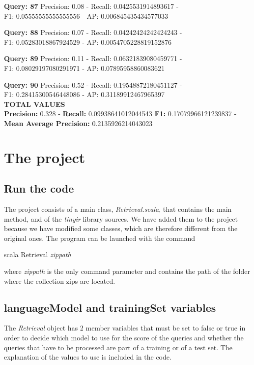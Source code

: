 \documentclass[a4paper, 11pt]{article}
\begin{document}
\textbf{Query: 87}
Precision: 0.08 - Recall: 0.0425531914893617 - \\
F1: 0.05555555555555556 - AP:  0.006845435434577033

\textbf{Query: 88}
Precision: 0.07 - Recall: 0.04242424242424243 - \\
F1: 0.05283018867924529 - AP:  0.0054705228819152876

\textbf{Query: 89}
Precision: 0.11 - Recall: 0.06321839080459771 - \\
F1: 0.08029197080291971 - AP:  0.07895958860083621

\textbf{Query: 90}
Precision: 0.52 - Recall: 0.19548872180451127 - \\
F1: 0.28415300546448086 - AP:  0.31189912467965397\\

\textbf{TOTAL VALUES}\\

\textbf{Precision:} 0.328 - \textbf{Recall:} 0.09938641012044543 \textbf{F1:} 0.17079966121239837 -\\
 \textbf{Mean Average Precision:} 0.2135926214043023


\section{The project}

\subsection{Run the code}
The project consists of a main class, \textit{Retrieval.scala}, that contains the main method, and of the \textit{tinyir} library sources. We have added them to the project because we have modified some classes, which are therefore different from the original ones.
The program can be launched with the command

\begin{center}
scala Retrieval \textit{zippath}
\end{center}

where \textit{zippath} is the only command parameter and contains the path of the folder where the collection zips are located.

\subsection{languageModel and trainingSet variables}
The \textit{Retrieval} object has 2 member variables that must be set to false or true in order to decide which model to use for the score of the queries and whether the queries 
that have to be processed are part of a training or of a test set. The explanation of the values to use is included in the code.
\end{document}
